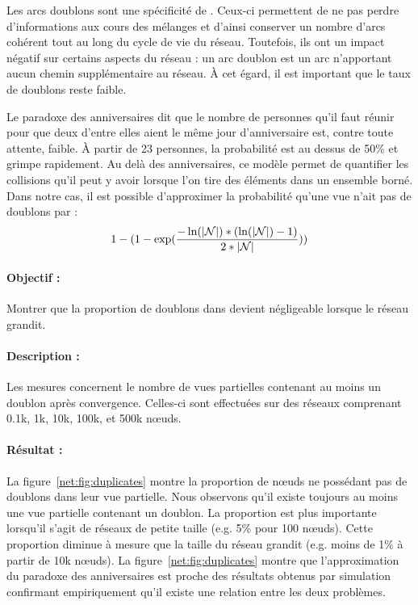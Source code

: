Les arcs doublons sont une spécificité de \SPRAY. Ceux-ci permettent de ne pas
perdre d'informations aux cours des mélanges et d'ainsi conserver un nombre
d'arcs cohérent tout au long du cycle de vie du réseau. Toutefois, ils ont un
impact négatif sur certains aspects du réseau : un arc doublon est un arc
n'apportant aucun chemin supplémentaire au réseau. À cet égard, il est important
que le taux de doublons reste faible.

Le paradoxe des anniversaires dit que le nombre de personnes qu'il faut réunir
pour que deux d'entre elles aient le même jour d'anniversaire est, contre toute
attente, faible. À partir de 23 personnes, la probabilité est au dessus de 50\%
et grimpe rapidement. Au delà des anniversaires, ce modèle permet de quantifier
les collisions qu'il peut y avoir lorsque l'on tire des éléments dans un
ensemble borné. Dans notre cas, il est possible d'approximer la probabilité
qu'une vue n'ait pas de doublons par :
\begin{equation*}
  1-
  (1-
  \exp({-\ln(|\mathcal{N}|)*(\ln(|\mathcal{N}|)-1)\over{2*|\mathcal{N}|}}))
\end{equation*}

\paragraph{Objectif :} Montrer que la proportion de doublons dans \SPRAY devient
négligeable lorsque le réseau grandit.

\paragraph{Description :} Les mesures concernent le nombre de vues partielles
contenant au moins un doublon après convergence. Celles-ci sont effectuées sur
des réseaux comprenant 0.1k, 1k, 10k, 100k, et 500k nœuds.

\paragraph{Résultat :} La figure~\ref{net:fig:duplicates} montre la proportion
de nœuds ne possédant pas de doublons dans leur vue partielle. Nous observons
qu'il existe toujours au moins une vue partielle contenant un doublon. La
proportion est plus importante lorsqu'il s'agit de réseaux de petite taille
(e.g. 5\% pour 100 nœuds). Cette proportion diminue à mesure que la taille du
réseau grandit (e.g. moins de 1\% à partir de 10k nœuds). La
figure~\ref{net:fig:duplicates} montre que l'approximation du paradoxe des
anniversaires est proche des résultats obtenus par simulation confirmant
empiriquement qu'il existe une relation entre les deux problèmes.

